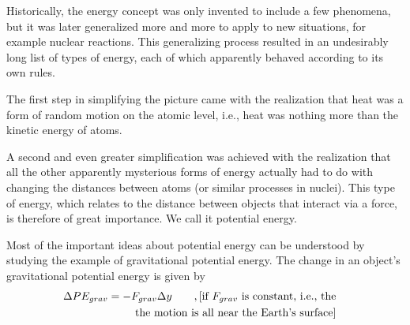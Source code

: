 \begin{summary}

\begin{vocab}


\end{vocab}

\begin{notation}


\end{notation}

\begin{othernotation}


\end{othernotation}

\begin{summarytext}

Historically, the energy concept was only invented to
include a few phenomena, but it was later generalized more
and more to apply to new situations, for example nuclear
reactions. This generalizing process resulted in an
undesirably long list of types of energy, each of which
apparently behaved according to its own rules.

The first step in simplifying the picture came with the
realization that heat was a form of random motion on the
atomic level, i.e., heat was nothing more than the kinetic energy of atoms.

A second and even greater simplification was achieved with
the realization that all the other apparently mysterious
forms of energy actually had to do with changing the
distances between atoms (or similar processes in nuclei).
This type of energy, which relates to the distance between
objects that interact via a force, is therefore of great
importance. We call it potential energy.

Most of the important ideas about potential energy can be
understood by studying the example of gravitational
potential energy. The change in an object's gravitational
potential energy is given by
\begin{multline*}
                \Delta PE_{grav}  =  -F_{grav} \Delta y   \qquad   ,
\hfill  \shoveright{\text{[if $F_{grav}$ is constant, i.e., the}}\\
\shoveright{\text{the motion is all near the Earth's surface]}}\\
\end{multline*}


\end{summarytext}
\end{summary}

